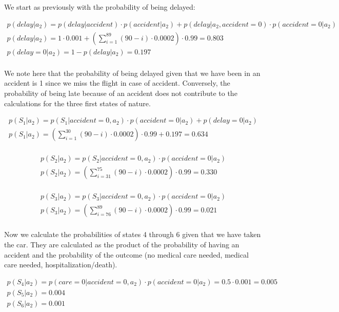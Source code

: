 \documentclass[letterpaper,12pt]{article}
\begin{document}
We start as previously with the probability of being delayed:

\begin{align*}
p(delay | a_2)= p(delay |accident) \cdot p(accident| a_2)+ p(delay|a_2, accident = 0) \cdot p(accident = 0 | a_2) \\
p(delay| a_2) = 1 \cdot 0.001 + \left(\sum_{i=1}^{89} (90 - i) \cdot 0.0002 \right) \cdot 0.99 = 0.803 \\
p(delay = 0 | a_2) = 1 - p(delay| a_2) = 0.197 \\
\end{align*}

We note here that the probability of being delayed given that we have been in an accident is 1 since we miss the flight in case of accident. Conversely, the probability of being late because of an accident does not contribute to the calculations for the three first states of nature.

\begin{align*}
p(S_1 | a_2)= p(S_1 |accident = 0, a_2) \cdot p(accident = 0 |a_2) + p(delay = 0 | a_2)\\
p(S_1| a_2) = \left(\sum_{i=1}^{30} (90 - i) \cdot 0.0002 \right) \cdot 0.99 + 0.197 = 0.634 \\
\end{align*}

\begin{align*}
p(S_2 | a_2)= p(S_2 |accident = 0, a_2) \cdot p(accident = 0 |a_2)\\
p(S_2| a_2) = \left(\sum_{i=31}^{75} (90 - i) \cdot 0.0002 \right) \cdot 0.99 = 0.330 \\
\end{align*}

\begin{align*}
p(S_3 | a_2)= p(S_3 |accident = 0, a_2) \cdot p(accident = 0 |a_2)\\
p(S_3| a_2) = \left(\sum_{i=76}^{89} (90 - i) \cdot 0.0002 \right) \cdot 0.99 = 0.021 \\
\end{align*}

Now we calculate the probabilities of states 4 through 6 given that we have taken the car. They are calculated as the product of the probability of having an accident and the probability of the outcome (no medical care needed, medical care needed, hospitalization/death).

\begin{align*}
p(S_4 | a_2)= p(care = 0 |accident = 0, a_2) \cdot p(accident = 0 |a_2) = 0.5 \cdot 0.001 = 0.005 \\
p(S_5| a_2) = 0.004 \\
p(S_6| a_2) = 0.001
\end{align*}
\end{document}
